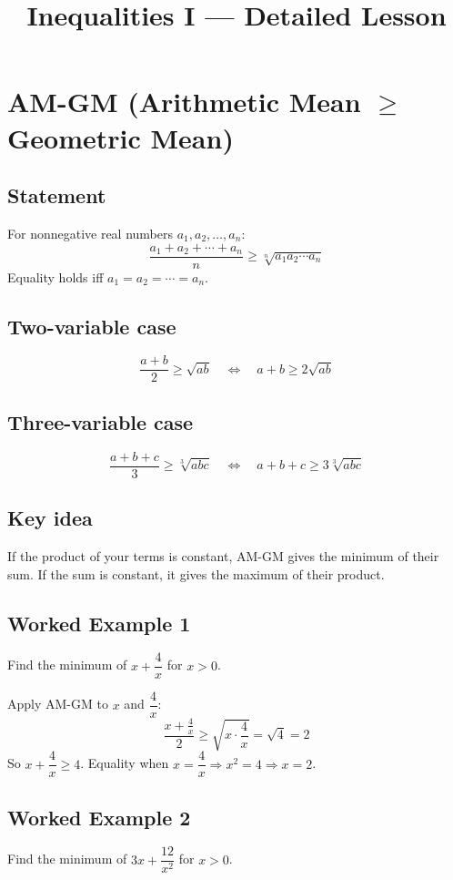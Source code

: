\documentclass{article}
\title{Inequalities I — Detailed Lesson}
\author{}
\date{}
\begin{document}
\maketitle

\section{AM-GM (Arithmetic Mean $\geq$ Geometric Mean)}

\subsection{Statement}

For nonnegative real numbers $a_1, a_2, \dots, a_n$:
\[
\frac{a_1 + a_2 + \cdots + a_n}{n} \geq \sqrt[n]{a_1 a_2 \cdots a_n}
\]
Equality holds iff $a_1 = a_2 = \cdots = a_n$.

\subsection{Two-variable case}
\[
\frac{a + b}{2} \geq \sqrt{ab} \quad\Longleftrightarrow\quad a + b \geq 2\sqrt{ab}
\]

\subsection{Three-variable case}
\[
\frac{a + b + c}{3} \geq \sqrt[3]{abc} \quad\Longleftrightarrow\quad a + b + c \geq 3\sqrt[3]{abc}
\]

\subsection{Key idea}
If the product of your terms is constant, AM-GM gives the minimum of their sum. If the sum is constant, it gives the maximum of their product.

\subsection{Worked Example 1}
Find the minimum of $x + \dfrac{4}{x}$ for $x > 0$.

Apply AM-GM to $x$ and $\dfrac{4}{x}$:
\[
\frac{x + \frac{4}{x}}{2} \geq \sqrt{x \cdot \frac{4}{x}} = \sqrt{4} = 2
\]
So $x + \dfrac{4}{x} \geq 4$. Equality when $x = \dfrac{4}{x} \Rightarrow x^2 = 4 \Rightarrow x = 2$.

\subsection{Worked Example 2}
Find the minimum of $3x + \dfrac{12}{x^2}$ for $x > 0$.
\end{document}
